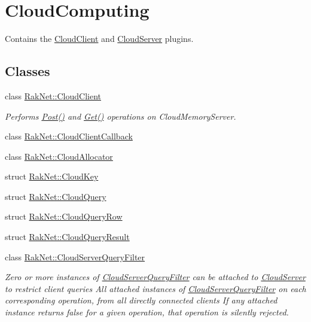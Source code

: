 \hypertarget{group___c_l_o_u_d___g_r_o_u_p}{\section{Cloud\-Computing}
\label{group___c_l_o_u_d___g_r_o_u_p}
}


Contains the \hyperlink{class_rak_net_1_1_cloud_client}{Cloud\-Client} and \hyperlink{class_rak_net_1_1_cloud_server}{Cloud\-Server} plugins.  


\subsection*{Classes}
\begin{DoxyCompactItemize}
\item 
class \hyperlink{class_rak_net_1_1_cloud_client}{Rak\-Net\-::\-Cloud\-Client}
\begin{DoxyCompactList}\small\item\em Performs \hyperlink{class_rak_net_1_1_cloud_client_aa561b024fd2f02c7f19c1cc36cfd2382}{Post()} and \hyperlink{class_rak_net_1_1_cloud_client_a97bcdfb7e824f979efa7491d3c837204}{Get()} operations on Cloud\-Memory\-Server. \end{DoxyCompactList}\item 
class \hyperlink{class_rak_net_1_1_cloud_client_callback}{Rak\-Net\-::\-Cloud\-Client\-Callback}
\item 
class \hyperlink{class_rak_net_1_1_cloud_allocator}{Rak\-Net\-::\-Cloud\-Allocator}
\item 
struct \hyperlink{struct_rak_net_1_1_cloud_key}{Rak\-Net\-::\-Cloud\-Key}
\item 
struct \hyperlink{struct_rak_net_1_1_cloud_query}{Rak\-Net\-::\-Cloud\-Query}
\item 
struct \hyperlink{struct_rak_net_1_1_cloud_query_row}{Rak\-Net\-::\-Cloud\-Query\-Row}
\item 
struct \hyperlink{struct_rak_net_1_1_cloud_query_result}{Rak\-Net\-::\-Cloud\-Query\-Result}
\item 
class \hyperlink{class_rak_net_1_1_cloud_server_query_filter}{Rak\-Net\-::\-Cloud\-Server\-Query\-Filter}
\begin{DoxyCompactList}\small\item\em Zero or more instances of \hyperlink{class_rak_net_1_1_cloud_server_query_filter}{Cloud\-Server\-Query\-Filter} can be attached to \hyperlink{class_rak_net_1_1_cloud_server}{Cloud\-Server} to restrict client queries All attached instances of \hyperlink{class_rak_net_1_1_cloud_server_query_filter}{Cloud\-Server\-Query\-Filter} on each corresponding operation, from all directly connected clients If any attached instance returns false for a given operation, that operation is silently rejected. \end{DoxyCompactList}\item 

\end{DoxyCompactItemize}
